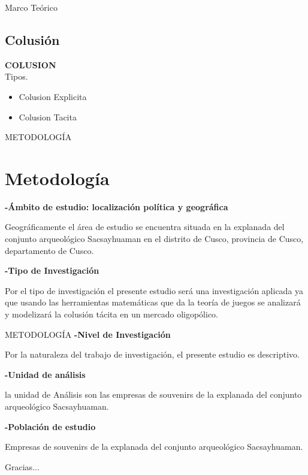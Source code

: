 \documentclass[11pt]{beamer}
\begin{document}
	\begin{frame}{Marco Teórico}
	
	
	\subsection{Colusión}	
	\textbf{COLUSION}
		\\Tipos.
		\begin{itemize}
			\item Colusion Explicita
			\item Colusion Tacita
		\end{itemize}
	
	\end{frame}
	\begin{frame}{METODOLOGÍA}
	\section{Metodología}
	
	\textbf{-Ámbito de estudio: localización política y geográfica}
	
	Geográficamente el área de estudio se encuentra situada en la explanada del conjunto arqueológico Sacsayhuaman en el distrito de Cusco, provincia de Cusco, departamento de Cusco.
	

	\textbf{-Tipo de Investigación}
	
	Por el tipo de investigación el presente estudio será una investigación aplicada ya que usando las herramientas matemáticas que da la teoría de juegos se analizará y modelizará la colusión tácita en un mercado oligopólico.
		
	\end{frame}
	\begin{frame}{METODOLOGÍA}
	\textbf{-Nivel de Investigación}
	
	Por la naturaleza del trabajo de investigación, el presente  estudio es  descriptivo.
	
	\textbf{-Unidad de análisis}
	
	la unidad de Análisis son las empresas de souvenirs de la explanada del conjunto arqueológico Sacsayhuaman.
	
	\textbf{-Población de estudio}	
	
	Empresas de souvenirs de la explanada del conjunto arqueológico Sacsayhuaman.
\end{frame}
	\begin{frame}
		\centering Gracias...
	\end{frame}
\end{document}
